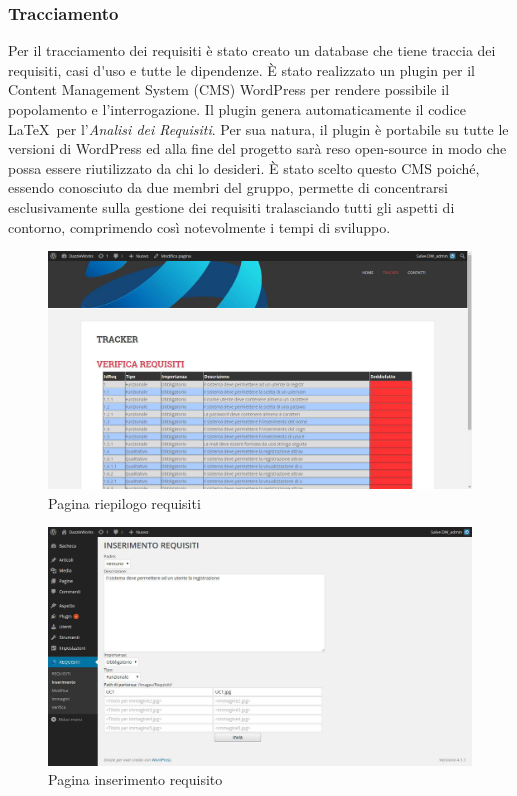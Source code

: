 \subsubsection{Tracciamento}
Per il tracciamento dei requisiti è stato creato un \gls{database} che tiene traccia dei requisiti, \gls{casi d'uso} e tutte le dipendenze.
È stato realizzato un \gls{plugin} per il Content Management System (\gls{CMS}) \gls{WordPress} per rendere possibile il popolamento e l'interrogazione.
Il \gls{plugin} genera automaticamente il codice \LaTeX\ per l'\textit{Analisi dei Requisiti}.
Per sua natura, il \gls{plugin} è portabile su tutte le versioni di \gls{WordPress} ed alla fine del progetto sarà reso open-source in modo che possa essere riutilizzato da chi lo desideri. È stato scelto questo \gls{CMS} poiché, essendo conosciuto da due membri del gruppo, permette di concentrarsi esclusivamente sulla gestione dei requisiti tralasciando tutti gli aspetti di contorno, comprimendo così notevolmente i tempi di sviluppo.
\begin{figure}[h]
\centering
\includegraphics[width=0.7\linewidth]{img/tracker1}
\caption[Pagina riepilogo requisiti]{Pagina riepilogo requisiti}
\label{fig:tracker1}
\end{figure}
\begin{figure}[h]
\centering
\includegraphics[width=0.7\linewidth]{img/tracker2}
\caption[Pagina inserimento requisito]{Pagina inserimento requisito}
\label{fig:tracker2}
\end{figure}


